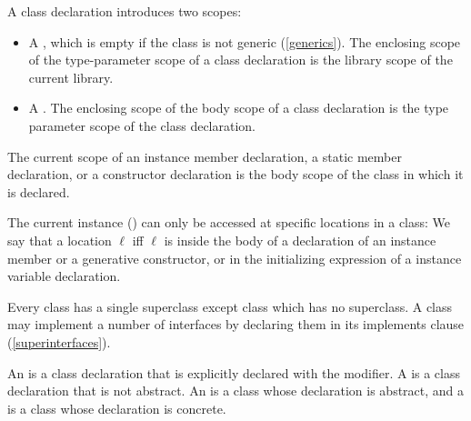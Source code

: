 \documentclass[makeidx]{article}
\begin{document}
\LMHash{}%
A class declaration introduces two scopes:
\begin{itemize}
\item
  A ,
  which is empty if the class is not generic (\ref{generics}).
  The enclosing scope of the type-parameter scope of a class declaration is
  the library scope of the current library.
\item
  A .
  The enclosing scope of the body scope of a class declaration is
  the type parameter scope of the class declaration.
\end{itemize}

\LMHash{}%
The current scope of an instance member declaration,
a static member declaration,
or a constructor declaration is
the body scope of the class in which it is declared.

\LMHash{}%
The current instance
()
can only be accessed at specific locations in a class:
We say that a location $\ell$
if{}f $\ell$ is inside the body of a declaration of
an instance member or a generative constructor,
or in the initializing expression of a \LATE{} instance variable declaration.


\LMHash{}%
Every class has a single superclass
except class  which has no superclass.
A class may implement a number of interfaces
by declaring them in its implements clause (\ref{superinterfaces}).

\LMHash{}%
An 
is a class declaration that is explicitly declared
with the \ABSTRACT{} modifier.
A 
is a class declaration that is not abstract.
An  is a class
whose declaration is abstract, and
a  is a class
whose declaration is concrete.

\end{document}

